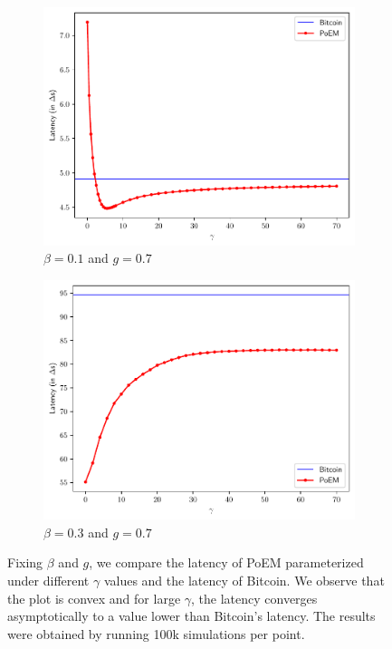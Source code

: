 \begin{figure}[pt]
    \centering
    \begin{subfigure}{0.48\textwidth}
    \centering
    \includegraphics[width = \textwidth]{figures/gamma_latency_0.1.pdf}
    \caption{$\beta = 0.1$ and $g = 0.7$}
    \label{fig:gamma_latency_0.1}
    \end{subfigure}
    \begin{subfigure}{0.48\textwidth}
    \centering
    \includegraphics[width = \textwidth]{figures/gamma_latency_0.3.pdf}
    \caption{$\beta = 0.3$ and $g = 0.7$}
    \label{fig:gamma_latency_0.3}
    \end{subfigure}

  \caption{Fixing $\beta$ and $g$, we compare the latency of PoEM parameterized under different $\gamma$ values
          and the latency of Bitcoin. We observe that the plot is convex and for large $\gamma$, the latency
          converges asymptotically to a value lower than Bitcoin's latency. The results were obtained by running 100k simulations per point.}
    \label{fig:gamma_latency}
\end{figure}

